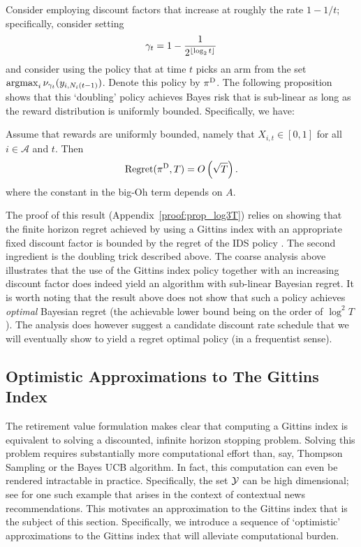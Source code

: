 Consider employing discount factors that increase at roughly the rate $1 - 1/t$; specifically, consider setting 
\[
\gamma_t = 
1 - 
\frac{1}
{2^{\floor{\log_2 t}}}%
\]
and consider using the policy that at time $t$ picks an arm from the set $\operatorname*{\mathrm{argmax}}_i \nu_{\gamma_t}(y_{i,N_i(t-1)})$. Denote this policy by $\pi^{\rm D}$. The following proposition shows that this `doubling' policy achieves Bayes risk that is sub-linear as long as the reward distribution is uniformly bounded. Specifically, we have:
\begin{proposition}
	\label{prop:gittins_log3T}
	Assume that rewards are uniformly bounded, namely that $X_{i,t} \in [0,1]$ for all $i \in \mathcal A$ and $t$. Then
	\[
	{\rm Regret}(\pi^{\rm D},T)
	=
	O
	\left(
	\sqrt T
	\right).
	\] 
	where the constant in the big-Oh term depends on $A$.
\end{proposition}
The proof of this result (Appendix~\ref{proof:prop_log3T}) relies on showing that the finite horizon regret achieved by using a Gittins index with an appropriate fixed discount factor is bounded by the regret of the IDS policy \citep{russo2014learning}. The second ingredient is the doubling trick described above. The coarse analysis above illustrates that the use of the Gittins index policy together with an increasing discount factor does indeed yield an algorithm with sub-linear Bayesian regret. It is worth noting that the result above does not show that such a policy achieves {\em optimal} Bayesian regret (the achievable lower bound being on the order of $\log^2T$ \citep{lai1987adaptive}). The analysis does however suggest a candidate discount rate schedule that we will eventually show to yield a regret optimal policy (in a frequentist sense). 
 
\subsection{Optimistic Approximations to The Gittins Index}\label{sec:approx_agi_deriv}

The retirement value formulation makes clear that computing a Gittins index is equivalent to solving a discounted, infinite horizon stopping problem. Solving this problem requires substantially more computational effort than, say, Thompson Sampling or the Bayes UCB algorithm. In fact, this computation can even be rendered intractable in practice. Specifically, the set $\mathcal Y$ can be high dimensional; see \citep{chapelle2011empirical} for one such example that arises in the context of contextual news recommendations. This motivates an approximation to the Gittins index that is the subject of this section. Specifically, we introduce a sequence of `optimistic' approximations to the Gittins index that will alleviate computational burden. 

